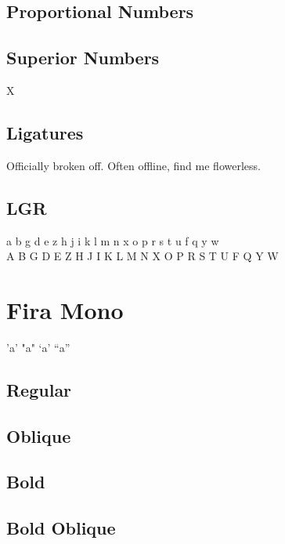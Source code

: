 \documentclass{article}
\begin{document}
\subsection*{Proportional Numbers}

{}

\subsection*{Superior Numbers}

X{}

\subsection*{Ligatures}


Officially broken off. Often offline, find me flowerless.

\subsection*{LGR}

{\firalgr\noindent
 a b g d e z h j i k l m n x o p r s t u f q y w\\
 A B G D E Z H J I K L M N X O P R S T U F Q Y W\\
}

\section*{Fira Mono}
\ttfamily

'a' \quad "a" \quad `a' \quad ``a''

\subsection*{Regular}

\lipsum[1]


\subsection*{Oblique}

\textsl{\lipsum[1]}

\subsection*{Bold}

\textbf{\lipsum[3]}

\subsection*{Bold Oblique}
\end{document}
